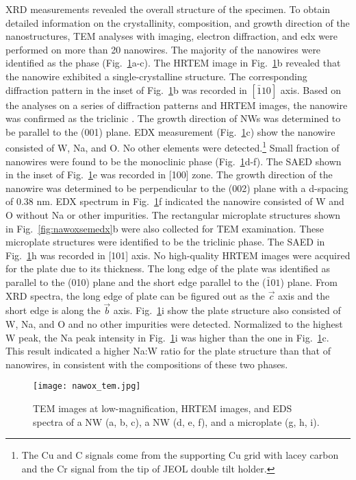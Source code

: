 XRD measurements revealed the overall structure of the specimen. To obtain detailed information on the crystallinity, composition, and growth direction of the nanostructures, TEM analyses with imaging, electron diffraction, and \gls{edx} were performed on more than 20 nanowires. The majority of the nanowires were identified as the  phase (Fig.~\ref{fig:nawoxtem}a-c). The HRTEM image in Fig.~\ref{fig:nawoxtem}b revealed that the nanowire exhibited a single-crystalline structure. The corresponding diffraction pattern in the inset of Fig.~\ref{fig:nawoxtem}b was recorded in $[\bar{1}10]$ axis. Based on the analyses on a series of diffraction patterns and HRTEM images, the nanowire was confirmed as the triclinic . The growth direction of  NWs was determined to be parallel to the (001) plane. EDX measurement (Fig.~\ref{fig:nawoxtem}c) show the nanowire consisted of W, Na, and O. No other elements were detected.\footnote{The Cu and C signals come from the supporting Cu grid with lacey carbon and the Cr signal from the tip of JEOL double tilt holder.} Small fraction of nanowires were found to be the monoclinic  phase (Fig.~\ref{fig:nawoxtem}d-f). The SAED shown in the inset of Fig.~\ref{fig:nawoxtem}e was recorded in [100] zone. The growth direction of the  nanowire was determined to be perpendicular to the (002) plane with a d-spacing of 0.38 nm. EDX spectrum in Fig.~\ref{fig:nawoxtem}f indicated the nanowire consisted of W and O without Na or other impurities. The rectangular microplate structures shown in Fig.~\ref{fig:nawoxsemedx}b were also collected for TEM examination. These microplate structures were identified to be the triclinic  phase. The SAED in Fig.~\ref{fig:nawoxtem}h was recorded in [101] axis. No high-quality HRTEM images were acquired for the  plate due to its thickness. The long edge of the plate was identified as parallel to the (010) plane and the short edge parallel to the ($\bar{1}01$) plane. From XRD spectra, the long edge of  plate can be figured out as the $\vec{c}$ axis and the short edge is along the $\vec{b}$ axis. Fig.~\ref{fig:nawoxtem}i show the plate structure also consisted of W, Na, and O and no other impurities were detected. Normalized to the highest W peak, the Na peak intensity in Fig.~\ref{fig:nawoxtem}i was higher than the one in Fig.~\ref{fig:nawoxtem}c. This result indicated a higher Na:W ratio for the  plate structure than that of  nanowires, in consistent with the compositions of these two phases.
\begin{figure}[htb]
\centering
\texttt{[image: nawox\_tem.jpg]}
\caption[TEM analyses on sodium tungsten oxides sample]{TEM images at low-magnification, HRTEM images, and EDS spectra of a  NW (a, b, c), a  NW (d, e, f), and a  microplate (g, h, i).}
\label{fig:nawoxtem}
\end{figure}

